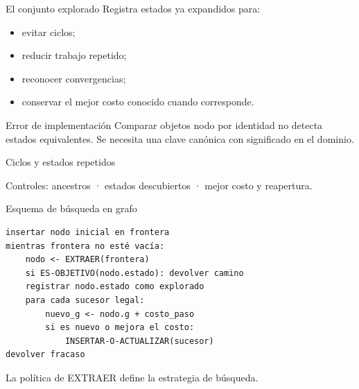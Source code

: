 \documentclass[aspectratio=169,11pt]{beamer}
\begin{document}
\begin{frame}{El conjunto explorado}
  Registra estados ya expandidos para:
  \begin{itemize}
    \item evitar ciclos;
    \item reducir trabajo repetido;
    \item reconocer convergencias;
    \item conservar el mejor costo conocido cuando corresponde.
  \end{itemize}
  \begin{alertblock}{Error de implementación}
    Comparar objetos nodo por identidad no detecta estados equivalentes. Se necesita una clave canónica con significado en el dominio.
  \end{alertblock}
\end{frame}

\begin{frame}{Ciclos y estados repetidos}
  \centering
  \vfill
  Controles: ancestros · estados descubiertos · mejor costo y reapertura.
\end{frame}

\begin{frame}[fragile]{Esquema de búsqueda en grafo}
\small
\begin{verbatim}
insertar nodo inicial en frontera
mientras frontera no esté vacía:
    nodo <- EXTRAER(frontera)
    si ES-OBJETIVO(nodo.estado): devolver camino
    registrar nodo.estado como explorado
    para cada sucesor legal:
        nuevo_g <- nodo.g + costo_paso
        si es nuevo o mejora el costo:
            INSERTAR-O-ACTUALIZAR(sucesor)
devolver fracaso
\end{verbatim}
\alert{La política de EXTRAER define la estrategia de búsqueda.}
\end{frame}
\end{document}
